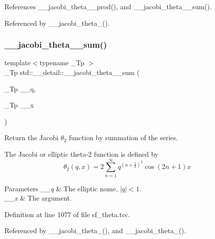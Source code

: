 References \+\_\+\+\_\+jacobi\+\_\+theta\+\_\+\_\+prod(), and \+\_\+\+\_\+jacobi\+\_\+theta\+\_\+\_\+sum().



Referenced by \+\_\+\+\_\+jacobi\+\_\+theta\+\_().

\mbox{\label{namespacestd_1_1____detail_a6eba88f5f854974b7fe7445e9b11a0e0}} 
\subsubsection{\texorpdfstring{\+\_\+\+\_\+jacobi\+\_\+theta\+\_\+\_\+sum()}{\_\_jacobi\_theta\_2\_sum()}}
{\footnotesize\ttfamily template$<$typename \+\_\+\+Tp $>$ \\
\+\_\+\+Tp std\+::\+\_\+\+\_\+detail\+::\+\_\+\+\_\+jacobi\+\_\+theta\+\_\+\_\+sum (\begin{DoxyParamCaption}\item[{\+\_\+\+Tp}]{\+\_\+\+\_\+q,  }\item[{\+\_\+\+Tp}]{\+\_\+\+\_\+x }\end{DoxyParamCaption})}

Return the Jacobi $ \theta_2 $ function by summation of the series.

The Jacobi or elliptic theta-\/2 function is defined by \[ \theta_2(q,x) = 2\sum_{n=1}^{\infty} q^{(n+\frac{1}{2})^2}\cos{(2n+1)x} \]


\begin{DoxyParams}{Parameters}
{\em \+\_\+\+\_\+q} & The elliptic nome, $ |q| < 1 $. \\
\hline
{\em \+\_\+\+\_\+x} & The argument. \\
\hline
\end{DoxyParams}


Definition at line 1077 of file sf\+\_\+theta.\+tcc.



Referenced by \+\_\+\+\_\+jacobi\+\_\+theta\+\_(), and \+\_\+\+\_\+jacobi\+\_\+theta\+\_().

\mbox{\label{namespacestd_1_1____detail_ac7a6c396a102438d2c104f344b4f6a72}} 
